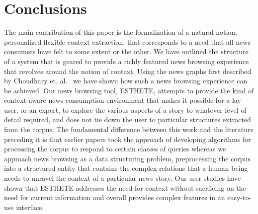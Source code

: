 \section{Conclusions}
\label{sec:conclusions}

The main contribution of this paper is the formalization of a natural
notion, personalized flexible context extraction, that corresponds to
a need that all news consumers have felt to some extent or the
other. We have outlined the structure of a system that is geared to
provide a richly featured news browsing experience that revolves
around the notion of context. Using the news graphs first described by
Choudhary et. al.~\cite{choudhary@ecir2008} we have shown how such a
news browsing experience can be achieved. Our news browsing tool,
ESTHETE, attempts to provide the kind of context-aware news
consumption environment that makes it possible for a lay user, or an
expert, to explore the various aspects of a story to whatever level of
detail required, and does not tie down the user to particular
structures extracted from the corpus. The fundamental difference
between this work and the literature preceding it is that earlier
papers took the approach of developing algorithms for processing the
corpus to respond to certain classes of queries whereas we approach
news browsing as a data structuring problem, preprocessing the corpus
into a structured entity that contains the complex relations that a
human being needs to unravel the context of a particular news
story. Our user studies have shown that ESTHETE addresses the need for
context without sacrficing on the need for current information and
overall provides complex features in an easy-to-use interface.

